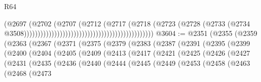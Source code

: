 \begin{lexlean}{R64}
\begin{coremodule}
                                                                              (@2697
                                                                                (@2702
                                                                                  (@2707
                                                                                    (@2712
                                                                                      (@2717
                                                                                        (@2718
                                                                                          (@2723
                                                                                            (@2728
                                                                                              (@2733
                                                                                                (@2734
                                                                                                  @3508)))))))))))))))))))))))))))))))))))))))))))))))
@3604 := @2351
    (@2355
      (@2359
        (@2363
          (@2367
            (@2371
              (@2375
                (@2379
                  (@2383
                    (@2387
                      (@2391
                        (@2395
                          (@2399
                            (@2400
                              (@2404
                                (@2405
                                  (@2409
                                    (@2413
                                      (@2417
                                        (@2421
                                          (@2425
                                            (@2426
                                              (@2427
                                                (@2431
                                                  (@2435
                                                    (@2436
                                                      (@2440
                                                        (@2444
                                                          (@2445
                                                            (@2449
                                                              (@2453
                                                                (@2458
                                                                  (@2463
                                                                    (@2468
                                                                      (@2473

\end{coremodule}
\end{lexlean}
